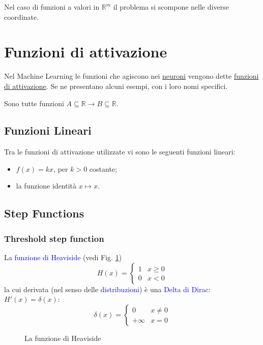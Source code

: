 \documentclass[10pt]{book}
\newcommand{\1}{\mathds{1}}
\newcommand{\R}{\mathds{R}}
\theoremstyle{definition}%
\theoremstyle{plain}
\theoremstyle{remark}
\renewcommand{\href}[2]{\textcolor{blue}{#2}}
\begin{document}
Nel caso di funzioni a valori in \(\R^{m}\) il problema si scompone nelle diverse coordinate.
\section{Funzioni di attivazione}
\label{sec:org594e902}
Nel Machine Learning le funzioni che agiscono nei \hyperref[sec:org779563c]{neuroni} vengono dette \uline{funzioni di attivazione}. Se ne presentano alcuni esempi, con i loro nomi specifici.

Sono tutte funzioni \(A \subseteq\R\to B \subseteq \R\).
\subsection{Funzioni Lineari}
\label{sec:org17b0e4c}

Tra le funzioni di attivazione utilizzate vi sono le seguenti funzioni lineari:
\begin{itemize}
\item \(f(x) = kx\), per \(k > 0\) costante;
\item la funzione identità \(x\mapsto x\).
\end{itemize}
\subsection{Step Functions}
\label{sec:org0a48f08}

\subsubsection{Threshold step function}
\label{sec:org644d04f}

La \href{../../../../../org/roam/20250624161413-funzione_di_heaviside.org}{funzione di Heaviside} (vedi Fig. \ref{fig:heav})
\begin{equation*}
H(x)=\begin{cases}
1 & x\ge 0\\
0 & x<0
\end{cases}
\end{equation*}
la cui derivata (nel senso delle \href{../../../../../org/roam/20250625100117-distribuzione_analisi_matematica.org}{distribuzioni}) è una \href{../../../../../org/roam/20250625100133-delta_di_dirac.org}{Delta di Dirac}: \(H'(x) = \delta(x)\):
\begin{equation*}
\delta(x) = \begin{cases}
0 & x\neq 0\\
+\infty & x=0
\end{cases}
\end{equation*}
\begin{figure}
\begin{center}
\end{center}
\caption{La funzione di Heaviside}\label{fig:heav}
\end{figure}
\end{document}
